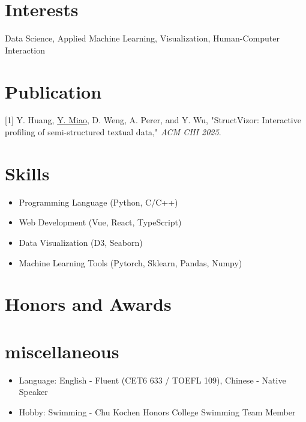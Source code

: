 \documentclass{resume}
\begin{document}
\section{Interests}
Data Science, Applied Machine Learning, Visualization, Human-Computer Interaction

\section{Publication}
{[1] Y. Huang, \uline{Y. Miao}, D. Weng, A. Perer, and Y. Wu, "StructVizor: Interactive profiling of
semi-structured textual data," \textit{ACM CHI 2025}.}


\section{Skills}
\begin{itemize}[parsep=0.5ex]
    \item Programming Language (Python, C/C++)
    \item Web Development (Vue, React, TypeScript)
    \item Data Visualization (D3, Seaborn)
    \item Machine Learning Tools (Pytorch, Sklearn, Pandas, Numpy)
\end{itemize}

\section{Honors and Awards}

\section{miscellaneous}
\begin{itemize}[parsep=0.5ex]
  \item Language: English - Fluent (CET6 633 / TOEFL 109), Chinese - Native Speaker
  \item Hobby: Swimming - Chu Kochen Honors College Swimming Team Member
\end{itemize}

%
%
\end{document}

